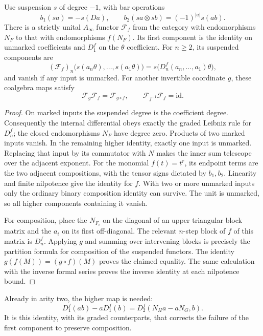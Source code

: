 \begin{theorem}
\label{thm:orientation-coordinate-functor}
Use suspension \(s\) of degree \(-1\), with bar operations
\[
 b_1(sa)=-s(Da),\qquad
 b_2(sa\otimes sb)=(-1)^{|a|}s(ab).
\]
There is a strictly unital \(A_\infty\) functor \(\mathcal F_f\)
from the category with endomorphisms \(N_F\) to that with
endomorphisms \(f(N_F)\).  Its first component is the identity on
unmarked coefficients and \(D_1^f\) on the \(\theta\) coefficient.
For \(n\ge2\), its suspended components are
\[
 (\mathcal F_f)_n
 \bigl(s(a_n\theta),\ldots,s(a_1\theta)\bigr)
 =s\bigl(D_n^f(a_n,\ldots,a_1)\theta\bigr),
\]
and vanish if any input is unmarked.  For another invertible coordinate
\(g\), these coalgebra maps satisfy
\[
 \mathcal F_g\mathcal F_f=\mathcal F_{g\circ f},\qquad
 \mathcal F_{f^{-1}}\mathcal F_f=\mathrm{id}.
\]
\end{theorem}
\begin{proof}
On marked inputs the suspended degree is the coefficient degree.
Consequently the internal differential obeys exactly the graded
Leibniz rule for \(D_n^f\); the closed endomorphisms \(N_F\) have
degree zero.  Products of two marked inputs vanish.  In the remaining
higher identity, exactly one input is unmarked.  Replacing that input
by its commutator with \(N\) makes the inner sum telescope over the
adjacent exponent.  For the monomial \(f(t)=t^r\), its endpoint terms
are the two adjacent compositions, with the tensor signs dictated by
\(b_1,b_2\).  Linearity and finite nilpotence give the identity for
\(f\).  With two or more unmarked inputs only the ordinary binary
composition identity can survive.  The unit is unmarked, so all higher
components containing it vanish.

For composition, place the \(N_{F_i}\) on the diagonal of an upper
triangular block matrix and the \(a_i\) on its first off-diagonal.
The relevant \(n\)-step block of \(f\) of this matrix is \(D_n^f\).
Applying \(g\) and summing over intervening blocks is precisely the
partition formula for composition of the suspended functors.  The
identity \(g(f(M))=(g\circ f)(M)\) proves the claimed equality.
The same calculation with the inverse formal series proves the inverse
identity at each nilpotence bound.
\end{proof}

Already in arity two, the higher map is needed:
\[
 D_1^f(ab)-aD_1^f(b)=D_2^f(N_Ha-aN_G,b).
\]
It is this identity, with its graded counterparts, that corrects the
failure of the first component to preserve composition.


